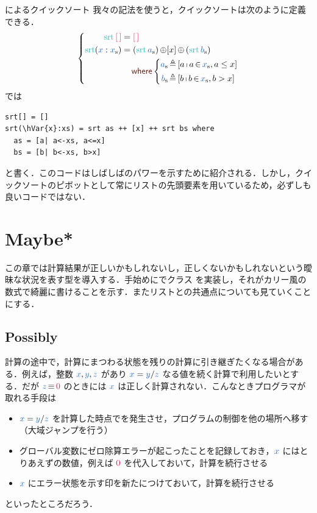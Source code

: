 \documentclass[a5paper,twoside,fleqn,draft]{jsbook}
\begin{document}
\begin{note}{\haskell によるクイックソート}
我々の記法を使うと，クイックソートは次のように定義できる．
\begin{equation*}
  \left\{
  \begin{aligned}
    \mSort\mEmptyList
    &=\mEmptyList\\
    \mSort(\hVar{x}:\mList{x})
    &=(\mSort\mList{a})\mAppend[x]\mAppend{}(\mSort\mList{b})\\
    &\quad\mWhere\left\{\begin{aligned}
    \mList{a}&\mLetEq{}[a\mListComp a\mFrom\mList{x},a\le x]\\
    \mList{b}&\mLetEq{}[b\mListComp b\mFrom\mList{x},b>x]
    \end{aligned}
    \right.
  \end{aligned}
  \right.
\end{equation*}
\haskell では %
\begin{haskellcode}
\begin{verbatim}
srt[] = []
srt(\hVar{x}:xs) = srt as ++ [x] ++ srt bs where
  as = [a| a<-xs, a<=x]
  bs = [b| b<-xs, b>x]
\end{verbatim}
\end{haskellcode}
と書く．このコードはしばしば\haskell のパワーを示すために紹介される．しかし，クイックソートのピボットとして常にリストの先頭要素を用いているため，必ずしも良いコードではない．
\end{note}

\chapter{Maybe*}
\label{ch:maybe}

\begin{leader}
この章では計算結果が正しいかもしれないし，正しくないかもしれないという曖昧な状況を表す型を導入する．手始めに\python でクラス  を実装し，それがカリー風の数式で綺麗に書けることを示す．またリストとの共通点についても見ていくことにする．
\end{leader}

\section{Possibly}

計算の途中で，計算にまつわる状態を残りの計算に引き継ぎたくなる場合がある．例えば，整数 $\hVar{x},\hVar{y},\hVar{z}$ があり $\hVar{x}=\hVar{y}/\hVar{z}$ なる値を続く計算で利用したいとする．だが $\hVar{z}\hIfEq\hConstant{0}$ のときには $\hVar{x}$ は正しく計算されない．こんなときプログラマが取れる手段は
\begin{itemize}
\item $\hVar{x}=\hVar{y}/\hVar{z}$ を計算した時点でを発生させ，プログラムの制御を他の場所へ移す（大域ジャンプを行う）
\item グローバル変数にゼロ除算エラーが起こったことを記録しておき，$\hVar{x}$ にはとりあえずの数値，例えば $\hConstant{0}$ を代入しておいて，計算を続行させる
\item $\hVar{x}$ にエラー状態を示す印を新たにつけておいて，計算を続行させる
\end{itemize}
といったところだろう．
\end{document}
